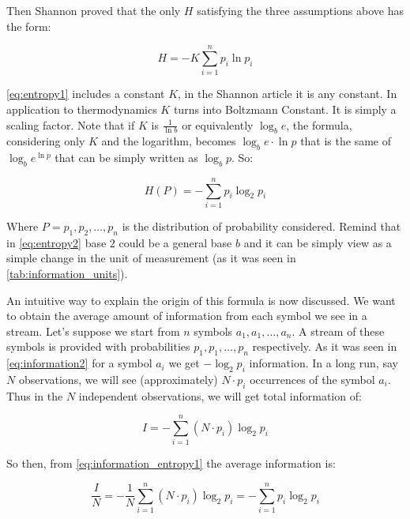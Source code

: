 \documentclass[12pt, a4paper]{report}
\begin{document}
Then Shannon proved that the only \(H\) satisfying the three assumptions above has the form:

\begin{equation} \label{eq:entropy1}
  H = -K \sum_{i = 1}^{n} p_i \ln p_i
\end{equation}

\autoref{eq:entropy1} includes a constant \(K\), in the Shannon article it is any constant.
In application to thermodynamics \(K\) turns into Boltzmann Constant.
It is simply a scaling factor.
Note that if \(K\) is \(\frac{1}{\ln b}\) or equivalently \(\log_b e\), the formula, considering only \(K\) and the logarithm,
becomes \(\log_b e \cdot \ln p\) that is the same of \(\log_b e^{\ln p}\) that can be simply written as \(\log_b p\).
So:

\begin{equation} \label{eq:entropy2}
  H(P) = - \sum_{i = 1}^{n} p_i \log_2 p_i
\end{equation}

Where \(P = {p_1, p_2, \dots, p_n}\) is the distribution of probability considered.
Remind that in \autoref{eq:entropy2} base \(2\) could be a general base \(b\) and it can be simply view as a simple change in the
unit of measurement (as it was seen in \autoref{tab:information_units}).

An intuitive way to explain the origin of this formula is now discussed.
We want to obtain the average amount of information from each symbol we see in a stream.
Let's suppose we start from \(n\) symbols \(a_1, a_1, \dots, a_n\).
A stream of these symbols is provided with probabilities \(p_1, p_1, \dots, p_n\) respectively.
As it was seen in \autoref{eq:information2} for a symbol \(a_i\) we get \(-\log_2 p_i\) information.
In a long run, say \(N\) observations, we will see (approximately) \(N \cdot p_i\) occurrences of the symbol \(a_i\).
Thus in the \(N\) independent observations, we will get total information of:

\begin{equation} \label{eq:information_entropy1}
  I = - \sum_{i = 1}^n (N \cdot p_i) \log_2 p_i
\end{equation}

So then, from \autoref{eq:information_entropy1} the average information is:

\begin{equation} \label{eq:information_entropy2}
  \frac{I}{N} = - \frac{1}{N} \sum_{i = 1}^n (N \cdot p_i) \log_2 p_i = - \sum_{i = 1}^n p_i \log_2 p_i
\end{equation}
\end{document}
